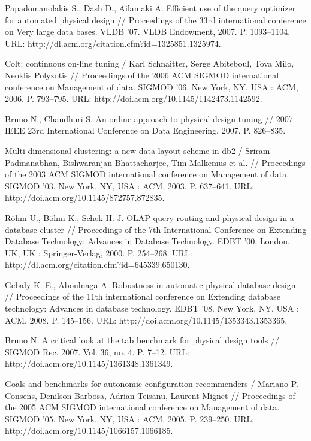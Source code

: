 \documentclass[unicode]{beamer}
\begin{document}
\begin{frame}[allowframebreaks]
{\begin{thebibliography}{99}
 Papadomanolakis S., Dash D., Ailamaki A. Efficient use of the query optimizer for automated physical design // Proceedings of the 33rd international conference on Very large data bases. VLDB ’07. VLDB Endowment, 2007. P. 1093--1104. URL: http://dl.acm.org/citation.cfm?id=1325851.1325974.

 Colt: continuous on-line tuning / Karl Schnaitter, Serge Abiteboul, Tova Milo, Neoklis Polyzotis // Proceedings of the 2006 ACM SIGMOD international conference on Management of data. SIGMOD ’06. New York, NY, USA : ACM, 2006. P. 793–795. URL: http://doi.acm.org/10.1145/1142473.1142592.

 Bruno N., Chaudhuri S. An online approach to physical design tuning // 2007 IEEE 23rd International Conference on Data Engineering. 2007. P. 826--835.

 Multi-dimensional clustering: a new data layout scheme in db2 / Sriram Padmanabhan, Bishwaranjan Bhattacharjee, Tim Malkemus et al. // Proceedings of the 2003 ACM SIGMOD international conference on Management of data. SIGMOD ’03. New York, NY, USA : ACM, 2003. P. 637--641. URL: http://doi.acm.org/10.1145/872757.872835.


 R\"{o}hm U., B\"{o}hm K., Schek H.-J. OLAP query routing and physical design in a database cluster // Proceedings of the 7th International Conference on Extending Database Technology: Advances in Database Technology. EDBT ’00. London, UK, UK : Springer-Verlag, 2000. P. 254--268. URL: http://dl.acm.org/citation.cfm?id=645339.650130.

 Gebaly K. E., Aboulnaga A. Robustness in automatic physical database design // Proceedings of the 11th international conference on Extending database technology: Advances in database technology. EDBT ’08. New York, NY, USA : ACM, 2008. P. 145–156. URL: http://doi.acm.org/10.1145/1353343.1353365.

 Bruno N. A critical look at the tab benchmark for physical design tools // SIGMOD Rec. 2007. Vol. 36, no. 4. P. 7--12. URL: http://doi.acm.org/10.1145/1361348.1361349.

 Goals and benchmarks for autonomic configuration recommenders / Mariano P. Consens, Denilson Barbosa, Adrian Teisanu, Laurent Mignet // Proceedings of the 2005 ACM SIGMOD international conference on Management of data. SIGMOD ’05. New York, NY, USA : ACM, 2005. P. 239--250. URL: http://doi.acm.org/10.1145/1066157.1066185.


\end{thebibliography}}
\end{frame}
\end{document}
